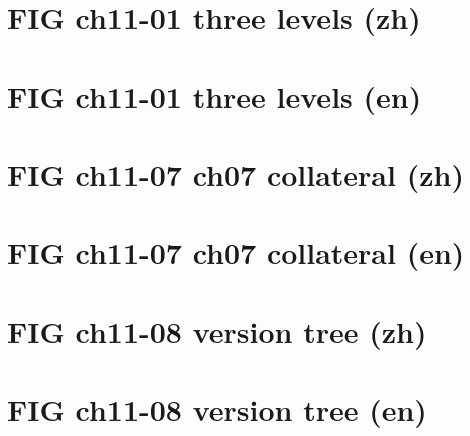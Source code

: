 \documentclass[UTF8,fontset=fandol,10pt]{ctexart}
\begin{document}
\section*{FIG ch11-01 three levels (zh)}

\newpage
\section*{FIG ch11-01 three levels (en)}

\newpage
\section*{FIG ch11-07 ch07 collateral (zh)}

\newpage
\section*{FIG ch11-07 ch07 collateral (en)}

\newpage
\section*{FIG ch11-08 version tree (zh)}

\newpage
\section*{FIG ch11-08 version tree (en)}

\end{document}
